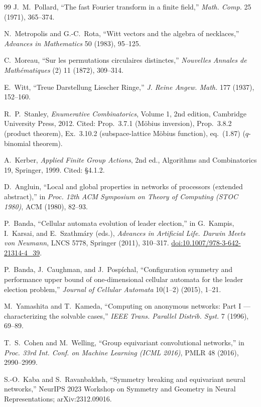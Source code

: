 \documentclass[11pt,a4paper]{article}
\theoremstyle{remark}
\begin{document}
\begin{thebibliography}{99}
J.~M.~Pollard,
``The fast Fourier transform in a finite field,''
\emph{Math. Comp.} 25 (1971), 365--374.

N.~Metropolis and G.-C.~Rota,
``Witt vectors and the algebra of necklaces,''
\emph{Advances in Mathematics} 50 (1983), 95--125.

C.~Moreau,
``Sur les permutations circulaires distinctes,''
\emph{Nouvelles Annales de Math\'ematiques} (2) 11 (1872), 309--314.

E.~Witt,
``Treue Darstellung Liescher Ringe,''
\emph{J. Reine Angew. Math.} 177 (1937), 152--160.

R.~P.~Stanley,
\emph{Enumerative Combinatorics}, Volume 1, 2nd edition,
Cambridge University Press, 2012. Cited: Prop.~3.7.1 (M\"obius
inversion), Prop.~3.8.2 (product theorem), Ex.~3.10.2 (subspace-lattice
M\"obius function), eq.~(1.87) ($q$-binomial theorem).

A.~Kerber,
\emph{Applied Finite Group Actions}, 2nd ed.,
Algorithms and Combinatorics 19, Springer, 1999. Cited: \S4.1.2.

D.~Angluin,
``Local and global properties in networks of processors (extended
abstract),''
in \emph{Proc. 12th ACM Symposium on Theory of Computing (STOC 1980)},
ACM (1980), 82--93.

P.~Banda,
``Cellular automata evolution of leader election,''
in G.~Kampis, I.~Karsai, and E.~Szathm\'ary (eds.),
\emph{Advances in Artificial Life. Darwin Meets von Neumann},
LNCS 5778, Springer (2011), 310--317.
\href{https://doi.org/10.1007/978-3-642-21314-4_39}{doi:10.1007/978-3-642-21314-4\_39}.

P.~Banda, J.~Caughman, and J.~Posp\'ichal,
``Configuration symmetry and performance upper bound of one-dimensional
cellular automata for the leader election problem,''
\emph{Journal of Cellular Automata} 10(1--2) (2015), 1--21.

M.~Yamashita and T.~Kameda,
``Computing on anonymous networks: Part I --- characterizing the solvable
cases,''
\emph{IEEE Trans. Parallel Distrib. Syst.} 7 (1996), 69--89.

T.~S.~Cohen and M.~Welling,
``Group equivariant convolutional networks,''
in \emph{Proc. 33rd Int. Conf. on Machine Learning (ICML 2016)}, PMLR 48
(2016), 2990--2999.

S.-O.~Kaba and S.~Ravanbakhsh,
``Symmetry breaking and equivariant neural networks,''
NeurIPS 2023 Workshop on Symmetry and Geometry in Neural Representations;
arXiv:2312.09016.


\end{thebibliography}
\end{document}

